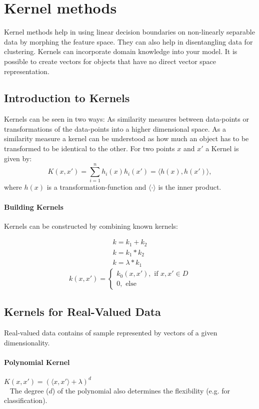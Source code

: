 \documentclass[../main.tex]{subfiles}
\begin{document}
\section{Kernel methods}
Kernel methods help in using linear decision boundaries on non-linearly separable data by morphing the feature space. They can also help in disentangling data for clustering. Kernels can incorporate domain knowledge into your model. It is possible to create vectors for objects that have no direct vector space representation. 

\subsection{Introduction to Kernels}
Kernels can be seen in two ways: As similarity measures between data-points or transformations of the data-points into a higher dimensional space. As a similarity measure a kernel can be understood as how much an object has to be transformed to be identical to the other. %
For two points $x$ and $x'$ a Kernel is given by:
\begin{equation}
    K(x,x') = \sum_{i=1}^n h_i(x) h_i(x') = \langle {h(x),h(x')} \rangle,
\end{equation}
where $h(x)$ is a transformation-function and $\langle \cdot \rangle$ is the inner product. 
\paragraph{Building Kernels} Kernels can be constructed by combining known kernels:

\begin{align*}
    k = k_1 + k_2 \\
    k = k_1 * k_2 \\
    k = \lambda * k_1 
\end{align*}
$$k(x,x') = \begin{cases} 
    k_0(x,x'), \text{ if } x, x' \in D \\
    0, \text{ else}
\end{cases}$$

\subsection{Kernels for Real-Valued Data}
Real-valued data contains of sample represented by vectors of a given dimensionality. 
\paragraph{Polynomial Kernel}  $K(x,x') = (\langle x,x' \rangle + \lambda)^d$ \\ 
        The degree ($d$) of the polynomial also determines the flexibility (e.g. for classification).
\end{document}
